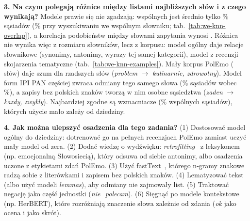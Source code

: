 \textbf{3. Na czym polegają różnice między listami najbliższych słów i z czego wynikają?}
Modele prawie się nie zgadzają: wspólnych jest średnio tylko \weOverlap\% sąsiadów (\weOverlapShared\% przy wyszukiwaniu
we wspólnym słowniku; tab.~\ref{tab:we-knn-overlap}), a korelacja podobieństw między słowami zapytania wynosi
\weRhoAll{}. Różnica nie wynika więc z rozmiaru słowników, lecz z korpusu: model ogólny daje relacje słownikowe
(synonimy, antonimy, wyrazy tej samej kategorii), model z recenzji -- skojarzenia tematyczne
(tab.~\ref{tab:we-knn-examples}). Mały korpus PolEmo (\wePolemoWords{} słów) daje szum dla rzadszych słów
(\emph{problem} $\to$ \emph{kulinarnie, zdrowotny}). Model form IPI PAN częściej zwraca odmiany tego samego słowa
(\weStemIpi\% sąsiadów wobec \weStemPol\%), a zapisy bez polskich znaków tworzą w nim osobne sąsiedztwa (\emph{zaden}
$\to$ \emph{kazdy, zwykly}). Najbardziej zgodne są wzmacniacze (\weOverlapWzm\% wspólnych sąsiadów), których użycie
mało zależy od dziedziny.

\textbf{4. Jak można ulepszyć osadzenia dla tego zadania?}
(1) Dostosować model ogólny do dziedziny: dotrenować go na pełnych recenzjach PolEmo zamiast uczyć mały model od zera.
(2) Dodać wiedzę o wydźwięku: \emph{retrofitting}~\cite{retrofit} z leksykonem (np. emocjonalną Słowosiecią), który
odsuwa od siebie antonimy, albo osadzenia uczone z etykietami zdań PolEmo. (3) Użyć fastText~\cite{fasttext}, którego
n-gramy znakowe radzą sobie z literówkami i zapisem bez polskich znaków. (4) Lematyzować tekst (albo użyć modeli
\emph{lemmas}), aby odmiany nie zajmowały list. (5) Traktować negację jako część jednostki (\emph{nie\_polecam}).
(6) Sięgnąć po modele kontekstowe (np. HerBERT), które rozróżniają znaczenie słowa zależnie od zdania (\emph{ok} jako
ocena i jako skrót).
